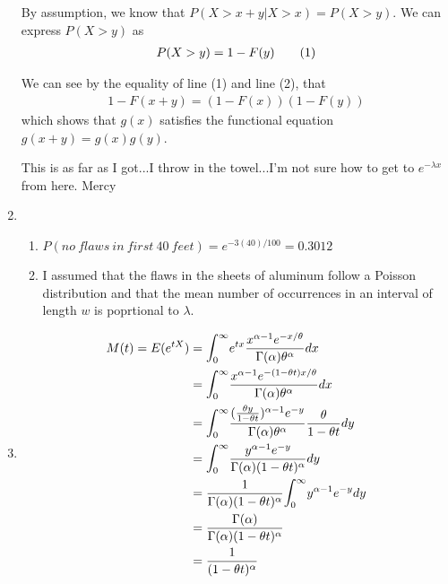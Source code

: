 \documentclass{article}
\newcommand\numberthis{\addtocounter{equation}{1}\tag{\theequation}}
\begin{document}
\begin{enumerate}
      By assumption, we know that $P(X > x+y | X > x) = P(X > y)$. We can express $P(X > y)$ as 
	\begin{align*}
	P(X > y) = 1 - F(y) \numberthis
	\end{align*}

      We can see by the equality of line (1) and line (2), that 
	\begin{align*}
	1 - F(x+y) = (1-F(x))(1-F(y))
	\end{align*}
      which shows that $g(x)$ satisfies the functional equation $g(x+y)=g(x)g(y)$.
      
      This is as far as I got...I throw in the towel...I'm not sure how to get to $e^{-\lambda x}$
      from here. Mercy      
      
     \addtocounter{enumi}{1}
     
     \item
      \begin{enumerate}
       \item 
	$P(no\ flaws\ in\ first\ 40\ feet) = e^{-3(40)/100} = 0.3012$
       
       \item
	I assumed that the flaws in the sheets of aluminum follow a Poisson distribution and that 
	the mean number of occurrences in an interval of length $w$ is poprtional to $\lambda$.
      \end{enumerate}
     
     \item
      \begin{align*}
       M(t) = E(e^{tX}) &= \mathlarger{\int}_0^\infty
	      {e^{tx}\dfrac{x^{\alpha - 1}e^{-x/\theta}}{\Gamma(\alpha)\theta^\alpha} dx} \\	
	    &= \mathlarger{\int}_0^\infty 
	      {\dfrac{x^{\alpha-1} e^{-(1-\theta t)x/\theta}}{\Gamma(\alpha)\theta^\alpha}dx}\\	    
	    &= \mathlarger{\int}_0^\infty
	      {\dfrac{(\frac{\theta y}{1 - \theta t})^{\alpha-1} e^{-y}}{\Gamma(\alpha)\theta^\alpha}\dfrac{\theta}{1-\theta t} dy}\\
	    &= \mathlarger{\int}_0^\infty
	      {\dfrac{y^{\alpha - 1}e^{-y}}{\Gamma(\alpha)(1-\theta t)^\alpha} dy} \\
	    &= \dfrac{1}{\Gamma(\alpha)(1-\theta t)^\alpha}\mathlarger{\int}_0^\infty {y^{\alpha -1}e^{-y} dy} \\
	    &= \dfrac{\Gamma(\alpha)}{\Gamma(\alpha)(1-\theta t)^\alpha} \\
	    &= \dfrac{1}{(1-\theta t)^\alpha}
      \end{align*}
     

\end{enumerate}
\end{document}

